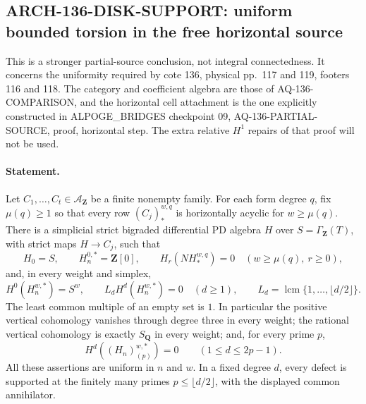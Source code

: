 \subsection{ARCH-136-DISK-SUPPORT: uniform bounded torsion in the free horizontal source}
\label{sec:arch136disksupport}

This is a stronger partial-source conclusion, not integral
connectedness.  It concerns the uniformity required by cote 136,
physical pp.~117 and 119, footers 116 and 118.  The category and
coefficient algebra are those of AQ-136-COMPARISON, and the horizontal
cell attachment is the one explicitly constructed in
ALPOGE\_BRIDGES checkpoint 09, AQ-136-PARTIAL-SOURCE, proof, horizontal
step.  The extra relative $H^1$ repairs of that proof will not be used.

\paragraph{Statement.}
Let $C_1,\ldots,C_t\in\mathcal A_{\mathbf Z}$ be a finite nonempty
family.  For each form degree $q$, fix $\mu(q)\geq1$ so that every
row $(C_j)_*^{w,q}$ is horizontally acyclic for $w\geq\mu(q)$.
There is a simplicial strict bigraded differential PD algebra $H$
over $S=\Gamma_{\mathbf Z}(T)$, with strict maps $H\to C_j$, such
that
\[
 H_0=S,\qquad H_n^{0,*}=\mathbf Z[0],\qquad
 H_r(NH_*^{w,q})=0\quad(w\geq\mu(q),\ r\geq0),             \tag{136.DS1}
\]
and, in every weight and simplex,
\[
 H^0(H_n^{w,*})=S^w,
 \qquad
 L_d H^d(H_n^{w,*})=0\quad(d\geq1),\qquad
 L_d=\operatorname{lcm}\{1,\ldots,\lfloor d/2\rfloor\}.     \tag{136.DS2}
\]
The least common multiple of an empty set is $1$.
In particular the positive vertical cohomology vanishes through
degree three in every weight; the rational vertical cohomology is
exactly $S_{\mathbf Q}$ in every weight; and, for every prime $p$,
\[
 H^d((H_n)_{(p)}^{w,*})=0
                   \qquad(1\leq d\leq2p-1).               \tag{136.DS3}
\]
All these assertions are uniform in $n$ and $w$.  In a fixed degree
$d$, every defect is supported at the finitely many primes
$p\leq\lfloor d/2\rfloor$, with the displayed common annihilator.

